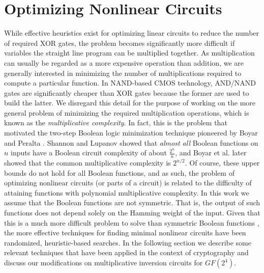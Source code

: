 \section{Optimizing Nonlinear Circuits}
While effective heuristics exist for optimizing linear circuits to reduce the number of required XOR gates, the problem becomes significantly more difficult if variables the straight line program can be multiplied together. As multiplication can usually be regarded as a more expensive operation than addition, we are generally interested in minimizing the number of multiplications required to compute a particular function. In NAND-based CMOS technology, AND/NAND gates are significantly cheaper than XOR gates because the former are used to build the latter. We disregard this detail for the purpose of working on the more general problem of minimizing the required multiplication operations, which is known as the \emph{multiplicative complexity}. In fact, this is the problem that motivated the two-step Boolean logic minimization technique pioneered by Boyar and Peralta \cite{Boyar12-1}. Shannon \cite{Shannon49-1} and Lupanov \cite{Lupanov58-1} showed that \emph{almost all} Boolean functions on $n$ inputs have a Boolean circuit complexity of about $\frac{2^n}{n}$, and Boyar et al. \cite{Boyar00-1} later showed that the common multiplicative complexity is $2^{n/2}$. Of course, these upper bounds do not hold for all Boolean functions, and as such, the problem of optimizing nonlinear circuits (or parts of a circuit) is related to the difficulty of attaining functions with polynomial multiplicative complexity. In this work we assume that the Boolean functions are not symmetric. That is, the output of such functions does not depend solely on the Hamming weight of the input. Given that this is a much more difficult problem to solve than symmetric Boolean functions \cite{Boyar00-1}, the more effective techniques for finding minimal nonlinear circuits have been randomized, heuristic-based searches. In the following section we describe some relevant techniques that have been applied in the context of cryptography and discuss our modifications on multiplicative inversion circuits for $GF(2^4)$.


